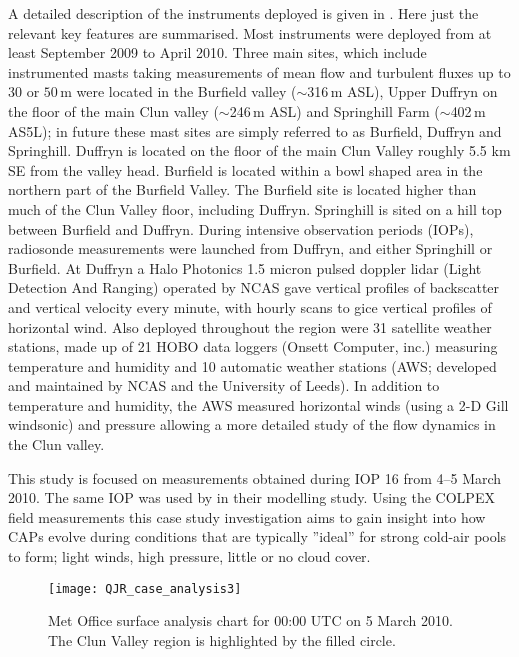 \documentclass[times]{qjrms4}
\begin{document}
A detailed description of the instruments deployed is given in \citet{price2010COLPEX}. Here just the relevant key features are summarised. Most instruments were deployed from at least September 2009 to April 2010. Three main sites, which include instrumented masts taking measurements of mean flow and turbulent fluxes up to 30 or $50\,\mbox{m}$ were located in the Burfield valley ($\sim$316$\,\mbox{m}$ ASL), Upper Duffryn on the floor of the main Clun valley ($\sim$246$\,\mbox{m}$ ASL) and Springhill Farm ($\sim$402$\,\mbox{m}$ AS5L); in future these mast sites are simply referred to as Burfield, Duffryn and Springhill. Duffryn is located on the floor of the main Clun Valley roughly 5.5 km SE from the valley head. Burfield is located within a bowl shaped area in the northern part of the Burfield Valley. The Burfield site is located higher than much of the Clun Valley floor, including Duffryn. Springhill is sited on a hill top between Burfield and Duffryn. During intensive observation periods (IOPs), radiosonde measurements were launched from Duffryn, and either Springhill or Burfield. At Duffryn a Halo Photonics 1.5 micron pulsed doppler lidar (Light Detection And Ranging) operated by NCAS gave vertical profiles of backscatter and vertical velocity every minute, with hourly scans to gice vertical profiles of horizontal wind. Also deployed throughout the region were 31 satellite weather stations, made up of 21 HOBO data loggers (Onsett Computer, inc.) measuring temperature and humidity and 10 automatic weather stations (AWS; developed and maintained by NCAS and the University of Leeds). In addition to temperature and humidity, the AWS measured horizontal winds (using a 2-D Gill windsonic) and pressure allowing a more detailed study of the flow dynamics in the Clun valley.

This study is focused on measurements obtained during IOP 16 from 4--5 March 2010. The same IOP was used by \citet{Vosper2013narrow} in their modelling study. Using the COLPEX field measurements this case study investigation aims to gain insight into how CAPs evolve during conditions that are typically ''ideal'' for strong cold-air pools to form; light winds, high pressure, little or no cloud cover.
        \begin{figure}
        \centering
        \texttt{[image: QJR\_case\_analysis3]}
        \caption{Met Office surface analysis chart for 00:00 UTC on 5 March 2010. The Clun Valley region is highlighted by the filled circle.}
        \label{fig:metcharts}
        \end{figure}
        
\end{document}
